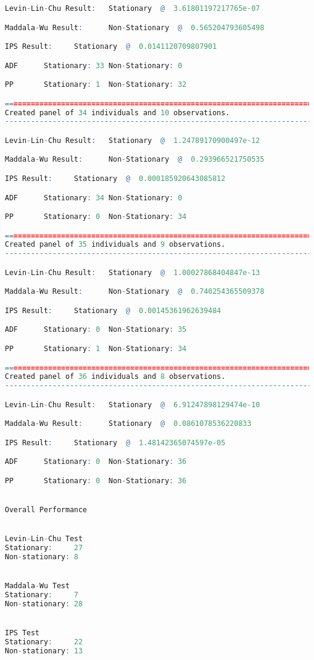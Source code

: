 \begin{lstlisting}[language=R]
Levin-Lin-Chu Result:   Stationary  @  3.61801197217765e-07

Maddala-Wu Result:      Non-Stationary  @  0.565204793605498

IPS Result:     Stationary  @  0.0141120709807901

ADF      Stationary: 33 Non-Stationary: 0

PP       Stationary: 1  Non-Stationary: 32

=========================================================================
Created panel of 34 individuals and 10 observations.
-------------------------------------------------------------------------

Levin-Lin-Chu Result:   Stationary  @  1.24789170900497e-12

Maddala-Wu Result:      Non-Stationary  @  0.293966521750535

IPS Result:     Stationary  @  0.000185920643085812

ADF      Stationary: 34 Non-Stationary: 0

PP       Stationary: 0  Non-Stationary: 34

=========================================================================
Created panel of 35 individuals and 9 observations.
-------------------------------------------------------------------------

Levin-Lin-Chu Result:   Stationary  @  1.00027868404847e-13

Maddala-Wu Result:      Non-Stationary  @  0.740254365509378

IPS Result:     Stationary  @  0.00145361962639484

ADF      Stationary: 0  Non-Stationary: 35

PP       Stationary: 1  Non-Stationary: 34

=========================================================================
Created panel of 36 individuals and 8 observations.
-------------------------------------------------------------------------

Levin-Lin-Chu Result:   Stationary  @  6.91247898129474e-10

Maddala-Wu Result:      Stationary  @  0.0861078536220833

IPS Result:     Stationary  @  1.48142365074597e-05

ADF      Stationary: 0  Non-Stationary: 36

PP       Stationary: 0  Non-Stationary: 36


Overall Performance


Levin-Lin-Chu Test
Stationary:     27
Non-stationary: 8


Maddala-Wu Test
Stationary:     7
Non-stationary: 28


IPS Test
Stationary:     22
Non-stationary: 13

\end{lstlisting}
